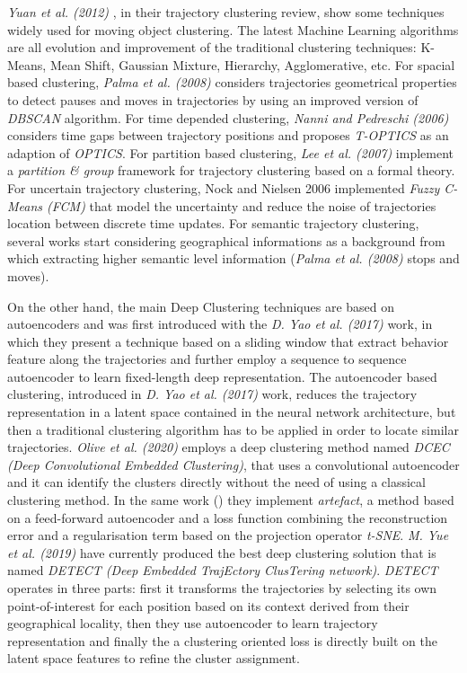 \textit{Yuan et al. (2012)} \cite{AIReview}, in their trajectory clustering review, show some techniques widely used for moving object clustering. The latest Machine Learning algorithms are all evolution and improvement of the traditional clustering techniques: K-Means, Mean Shift, Gaussian Mixture, Hierarchy, Agglomerative, etc. For spacial based clustering, \textit{Palma et al. (2008)} \cite{Palma2008} considers trajectories geometrical properties to detect pauses and moves in trajectories by using an improved version of \textit{DBSCAN} algorithm. For time depended clustering, \textit{Nanni and Pedreschi (2006)} \cite{Nanni2006} considers time gaps between trajectory positions and proposes \textit{T-OPTICS} as an adaption of \textit{OPTICS}. For partition based clustering, \textit{Lee et al. (2007)} \cite{Lee2007} implement a \textit{partition \& group} framework for trajectory clustering based on a formal theory. For uncertain trajectory clustering, Nock and Nielsen 2006 \cite{Nock2006} implemented \textit{Fuzzy C-Means (FCM)} that model the uncertainty and reduce the noise of trajectories location between discrete time updates. For semantic trajectory clustering, several works start considering geographical informations as a background from which extracting higher semantic level information (\textit{Palma et al. (2008)} \cite{Palma2008} stops and moves).

On the other hand, the main Deep Clustering techniques are based on autoencoders and was first introduced with the \textit{D. Yao et al. (2017)} \cite{DeepLearningRepresentation} work, in which they present a technique based on a sliding window that extract behavior feature along the trajectories and further employ a sequence to sequence autoencoder to learn fixed-length deep representation. The autoencoder based clustering, introduced in \textit{D. Yao et al. (2017)} \cite{DeepLearningRepresentation} work, reduces the trajectory representation in a latent space contained in the neural network architecture, but then a traditional clustering algorithm has to be applied in order to locate similar trajectories. \textit{Olive et al. (2020)} \cite{DeepLearningAutoencoders} employs a deep clustering method named \textit{DCEC (Deep Convolutional Embedded Clustering)}, that uses a convolutional autoencoder and it can identify the clusters directly without the need of using a classical clustering method. In the same work (\cite{DeepLearningAutoencoders}) they implement \textit{artefact}, a method based on a feed-forward autoencoder and a loss function combining the reconstruction error and a regularisation term based on the projection operator \textit{t-SNE}. \textit{M. Yue et al. (2019)} \cite{DETECT} have currently produced the best deep clustering solution that is named \textit{DETECT (Deep Embedded TrajEctory ClusTering network)}. \textit{DETECT} operates in three parts: first it transforms the trajectories by selecting its own point-of-interest for each position based on its context derived from their geographical locality, then they use autoencoder to learn trajectory representation and finally the a clustering oriented loss is directly built on the latent space features to refine the cluster assignment.

